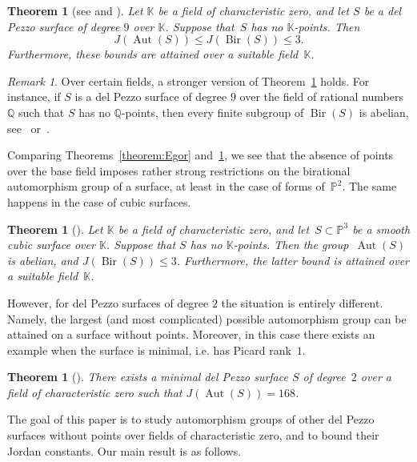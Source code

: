 \documentclass[12pt]{amsart}
\newcounter{cequation}[section]
\newtheorem{theorem}[cequation]{Theorem}
\theoremstyle{definition}
\theoremstyle{remark}
\newtheorem{remark}[cequation]{Remark}
\newcommand{\QQ}{\mathbb{Q}}
\newcommand{\PP}{\mathbb{P}}
\newcommand{\KK}{\mathbb{K}}
\newcommand{\Aut}{\operatorname{Aut}}
\newcommand{\Bir}{\operatorname{Bir}}
\def \le {\leqslant}
\begin{document}
\begin{theorem}[{see \cite[Theorem~1.2(ii)]{Shramov-SB} and \cite{Shramov-SB-short}}]
\label{theorem:SB}
Let $\KK$ be a field of characteristic zero, and let $S$ be a del Pezzo
surface of degree $9$ over $\KK$. Suppose that~$S$ has no $\KK$-points.
Then
$$
J(\Aut(S))\le J(\Bir(S))\le 3.
$$
Furthermore, these bounds are attained
over a suitable field~$\KK$.
\end{theorem}

\begin{remark}
Over certain fields, a stronger version of Theorem~\ref{theorem:SB} holds.
For instance, if $S$ is a del Pezzo
surface of degree $9$ over the field of rational numbers $\QQ$ such that $S$ has no $\QQ$-points, then
every finite subgroup of $\Bir(S)$ is abelian, see~\mbox{\cite[Corollary~1.4]{Shramov-SB-final}}
or~\mbox{\cite[Theorem~1.3]{Vikulova-SB}}.
\end{remark}


Comparing Theorems~\ref{theorem:Egor} and~\ref{theorem:SB}, we see
that the absence of points over the base field imposes
rather strong restrictions on the birational automorphism group
of a surface, at least in the case of forms of~$\PP^2$.
The same happens in the case of cubic surfaces.

\begin{theorem}[{\cite[Theorem~1.4]{Shramov-Cubics}}]
\label{theorem:cubics}
Let $\KK$ be a field of characteristic zero, and let~\mbox{$S\subset\PP^3$}
be a smooth cubic surface over $\KK$.
Suppose that $S$ has no $\KK$-points.
Then the group~\mbox{$\Aut(S)$} is abelian, and $J(\Bir(S))\le 3$.
Furthermore, the latter bound is attained
over a suitable field~$\KK$.
\end{theorem}



However, for del Pezzo surfaces of degree $2$ the situation is entirely different.
Namely, the largest (and most complicated) possible automorphism
group can be attained on a surface without points. Moreover, in this case
there exists an example when the surface is minimal, i.e. has Picard rank~$1$.

\begin{theorem}[{\cite[Theorem~1.4]{Vikulova-dP}}]
\label{theorem:Vikulova}
There exists a minimal del Pezzo surface $S$ of degree~$2$ over a
field of characteristic zero such that $J(\Aut(S))=168$.
\end{theorem}

The goal of this paper is to study automorphism groups
of other del Pezzo surfaces without points
over fields of characteristic
zero, and to bound their Jordan constants.
Our main result is as follows.
\end{document}
